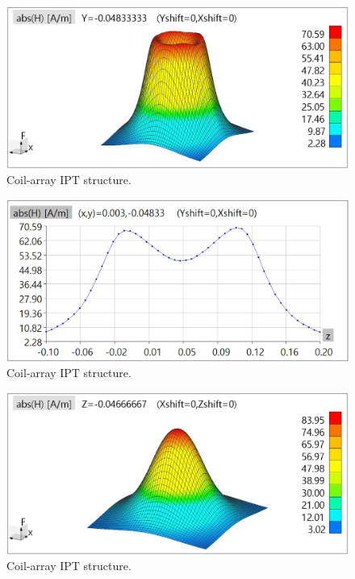 \begin{figure}[htbp]
    \centering
    \includegraphics[width=0.9\linewidth]{images/4_coil_array_near_field_distribution.JPG}
    \caption{Coil-array IPT structure.}
\end{figure}

\begin{figure}[htbp]
    \centering
    \includegraphics[width=0.9\linewidth]{images/4_coil_array_near_field_distribution_cut.JPG}
    \caption{Coil-array IPT structure.}
\end{figure}

\begin{figure}[htbp]
    \centering
    \includegraphics[width=0.9\linewidth]{images/4_two_ring_near_field_distribution.JPG}
    \caption{Coil-array IPT structure.}
\end{figure}

